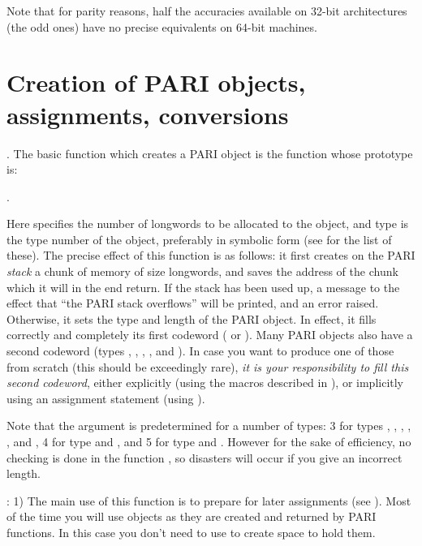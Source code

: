 Note that for parity reasons, half the accuracies available on 32-bit
architectures (the odd ones) have no precise equivalents on 64-bit machines.

\section{Creation of PARI objects, assignments, conversions}

.
The basic function which creates a PARI object is the function
 whose prototype is:

.

\noindent
Here  specifies the number of longwords to be allocated to the
object, and type is the type number of the object, preferably in symbolic
form (see  for the list of these). The precise effect of
this function is as follows: it first creates on the PARI \emph{stack} a
chunk of memory of size  longwords, and saves the address of the
chunk which it will in the end return.  If the stack has been used up, a
message to the effect that ``the PARI stack overflows'' will be printed,
and an error raised. Otherwise, it sets the type and length of the PARI object.
In effect, it fills correctly and completely its first codeword ( or
).  Many PARI objects also have a second codeword (types ,
,  , , and ). In case you want to
produce one of those from scratch (this should be exceedingly rare), \emph{it
is your responsibility to fill this second codeword}, either explicitly (using
the macros described in ), or implicitly using an assignment
statement (using ).

Note that the argument  is predetermined for a number of types:
3 for types , , , ,
,  and , 4 for type 
and , and 5 for type  and . However for the sake
of efficiency, no checking is done in the function , so
disasters will occur if you give an incorrect length.

:
1)  The main use of this function is to prepare for later assignments
(see ). Most of the time you will use  objects
as they are created and returned by PARI functions. In this case you don't need
to use  to create space to hold them.


